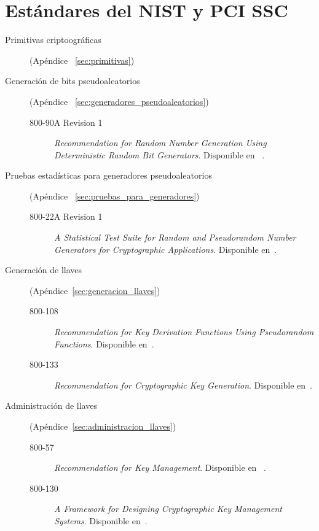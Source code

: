 %
%

\section{Estándares del NIST y PCI SSC}

\begin{description}

  \item[Primitivas criptoográficas] (Apéndice
   ~\ref{sec:primitivas})

  \item[Generación de bits pseudoaleatorios] (Apéndice
   ~\ref{sec:generadores_pseudoaleatorios})
    \begin{description}
      \item[800-90A Revision 1] \textit{Recommendation for Random Number
        Generation Using Deterministic Random Bit Generators}. Disponible en
       ~\cite{nist_aleatorios}.
    \end{description}

    \item[Pruebas estadísticas para generadores pseudoaleatorios] (Apéndice
    ~\ref{sec:pruebas_para_generadores})
    \begin{description}
      \item[800-22A Revision 1] \textit{A Statistical Test Suite for Random and
      Pseudorandom Number Generators for Cryptographic Applications}.
      Disponible en~\cite{nist_pruebas}.
    \end{description}

    \item[Generación de llaves] (Apéndice~\ref{sec:generacion_llaves})
    \begin{description}
      \item[800-108] \textit{Recommendation for Key Derivation Functions Using
      Pseudorandom Functions}. Disponible en~\cite{nist_derivacion_llaves}.
      \item[800-133] \textit{Recommendation for Cryptographic Key Generation}.
      Disponible en~\cite{nist_creacion_llaves}.
    \end{description}

  \item[Administración de llaves] (Apéndice~\ref{sec:administracion_llaves})
    \begin{description}
      \item[800-57] \textit{Recommendation for Key Management}. Disponible en
       ~\cite{nist_llaves}.
      \item[800-130] \textit{A Framework for Designing Cryptographic Key
        Management Systems}. Disponible en~\cite{nist_disenio_llaves}.
    \end{description}
\end{description}



